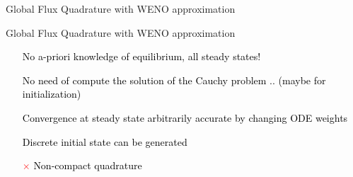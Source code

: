 \begin{frame}[t]{Global Flux Quadrature  with WENO approximation}
\end{frame}


\begin{frame}[t]{Global Flux Quadrature  with WENO approximation} 

\vspace{0.5cm}

\begin{enumerate}
\item[\textcolor{mblue1}{\Large\checkmark}] \textcolor{black}{No a-priori knowledge of equilibrium, all steady states!}    

\vspace{0.2cm}

\item[\textcolor{mblue1}{\Large\checkmark}] \textcolor{black}{No need of compute the solution of the Cauchy problem .. (maybe for initialization)}  

\vspace{0.2cm}

\item[\textcolor{mblue1}{\Large\checkmark}]  \textcolor{black}{Convergence at steady state arbitrarily accurate by changing ODE weights} 

\vspace{0.2cm}

\item[\textcolor{mblue1}{\Large\checkmark}]   \textcolor{black}{Discrete initial state can be generated}

\vspace{0.2cm}

\item[\textcolor{red}{\Large$\times$}]   \textcolor{black}{Non-compact quadrature }
\end{enumerate}



\end{frame}
% 